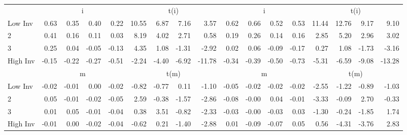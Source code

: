 \begin{table}[!ht]
\begin{tabular}{lrrrrrrrrrrrrrrrr}
  
     & \multicolumn{4}{c}{i} & \multicolumn{4}{c}{t(i)}  & \multicolumn{4}{c}{i} & \multicolumn{4}{c}{t(i)}   \\
     \cmidrule(r){2-5} \cmidrule(r){6-9}  \cmidrule(r){10-13} \cmidrule(r){14-17} 
    Low Inv  & 0.63  & 0.35  & 0.40  & 0.22  & 10.55  & 6.87  & 7.16  & 3.57  & 0.62  & 0.66  & 0.52  & 0.53  & 11.44  & 12.76  & 9.17  & 9.10   \\
    2  & 0.41  & 0.16  & 0.11  & 0.03  & 8.19  & 4.02  & 2.71  & 0.58  & 0.19  & 0.26  & 0.14  & 0.16  & 2.85  & 5.20  & 2.96  & 3.02   \\
    3  & 0.25  & 0.04  & -0.05  & -0.13  & 4.35  & 1.08  & -1.31  & -2.92  & 0.02  & 0.06  & -0.09  & -0.17  & 0.27  & 1.08  & -1.73  & -3.16   \\
    High Inv  & -0.15  & -0.22  & -0.27  & -0.51  & -2.24  & -4.40  & -6.92  & -11.78  & -0.34  & -0.39  & -0.50  & -0.73  & -5.31  & -6.59  & -9.08  & -13.28   \\
    
  
     & \multicolumn{4}{c}{m} & \multicolumn{4}{c}{t(m)}  & \multicolumn{4}{c}{m} & \multicolumn{4}{c}{t(m)}   \\
     \cmidrule(r){2-5} \cmidrule(r){6-9}  \cmidrule(r){10-13} \cmidrule(r){14-17} 
    Low Inv  & -0.02  & -0.01  & 0.00  & -0.02  & -0.82  & -0.77  & 0.11  & -1.10  & -0.05  & -0.02  & -0.02  & -0.02  & -2.55  & -1.22  & -0.89  & -1.03   \\
    2  & 0.05  & -0.01  & -0.02  & -0.05  & 2.59  & -0.38  & -1.57  & -2.86  & -0.08  & -0.00  & 0.04  & -0.01  & -3.33  & -0.09  & 2.70  & -0.33   \\
    3  & 0.01  & 0.05  & -0.01  & -0.04  & 0.38  & 3.51  & -0.82  & -2.33  & -0.03  & -0.00  & -0.03  & 0.03  & -1.30  & -0.24  & -1.85  & 1.74   \\
    High Inv  & -0.01  & 0.00  & -0.02  & -0.04  & -0.62  & 0.21  & -1.40  & -2.88  & 0.01  & -0.09  & -0.07  & 0.05  & 0.56  & -4.31  & -3.76  & 2.83   \\
    
  
  \bottomrule
\end{tabular}
\label{tbl:32_Size_OP_Inv_F17}
\end{table}